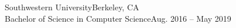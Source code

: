 
\resumeListStart
\resumeEducation
{Southwestern University}{Berkeley, CA}\\
\vspace*{8pt}
{Bachelor of Science in Computer Science}{Aug. 2016 -- May 2019}
\resumeListEnd
